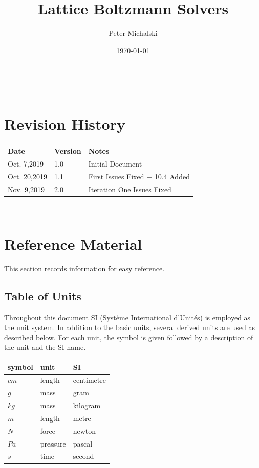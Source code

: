 \documentclass[12pt]{article}
\newcommand{\famname}{Lattice Boltzmann Solvers} %
\begin{document}
\title{\famname} 
\author{Peter Michalski}
\date{\today}

\maketitle

~\newpage


\section{Revision History}

\begin{tabularx}{\textwidth}{p{3cm}p{2cm}X}
\toprule {\bf Date} & {\bf Version} & {\bf Notes}\\
\midrule
Oct. 7,2019 & 1.0 & Initial Document\\
Oct. 20,2019 & 1.1 & First Issues Fixed + 10.4 Added\\
Nov. 9,2019 & 2.0 & Iteration One Issues Fixed\\
\bottomrule
\end{tabularx}

~\newpage
	
\section{Reference Material}

This section records information for easy reference.

\subsection{Table of Units}

Throughout this document SI (Syst\`{e}me International d'Unit\'{e}s) is employed
as the unit system.  In addition to the basic units, several derived units are
used as described below.  For each unit, the symbol is given followed by a
description of the unit and the SI name.
~\newline

\renewcommand{\arraystretch}{1.2}
  \noindent \begin{tabular}{l l l} 
    \toprule		
    \textbf{symbol} & \textbf{unit} & \textbf{SI}\\
    \midrule 
    $cm$ & length & centimetre\\
    $g$ & mass & gram \\
    $kg$ & mass	& kilogram\\
    $m$ & length & metre\\
    $N$ & force & newton\\
    $Pa$ & pressure & pascal\\
    $s$ & time & second\\
    \bottomrule
  \end{tabular}
\end{document}

